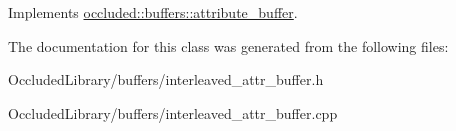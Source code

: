 Implements \hyperlink{classoccluded_1_1buffers_1_1attribute__buffer_a323a2283330b0bcf4909e8d93bfc594a}{occluded\+::buffers\+::attribute\+\_\+buffer}.



The documentation for this class was generated from the following files\+:\begin{DoxyCompactItemize}
\item 
Occluded\+Library/buffers/interleaved\+\_\+attr\+\_\+buffer.\+h\item 
Occluded\+Library/buffers/interleaved\+\_\+attr\+\_\+buffer.\+cpp\end{DoxyCompactItemize}
